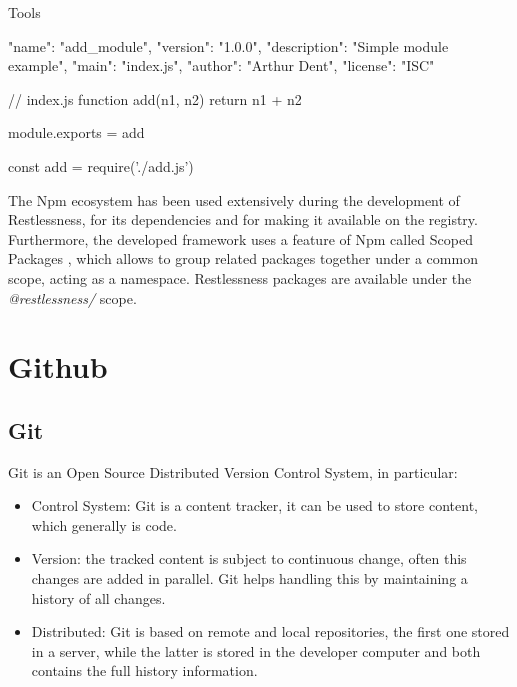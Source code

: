 \begin{chapter}{Tools}
    \bigskip
    \begin{code}[caption=A simple \textit{package.json},
        label={lst:add_module}, language=json]
{
    "name": "add_module",
    "version": "1.0.0",
    "description": "Simple module example",
    "main": "index.js",
    "author": "Arthur Dent",
    "license": "ISC"
}
    \end{code}

    \bigskip
    \begin{code}[caption=CommonJs module definition, label={lst:add_fn}]
// index.js
function add(n1, n2) {
  return n1 + n2
}

module.exports = add
    \end{code}

    \bigskip
    \begin{code}[caption=CommonJs module usage, label={lst:add_require}]
const add = require('./add.js')
    \end{code}

    The Npm ecosystem has been used extensively during the development of Restlessness,
    for its dependencies and for making it available on the registry.
    Furthermore, the developed framework uses a feature of Npm called Scoped Packages
    \cite{npm_scoped_packages}, which allows to group related packages together
    under a common scope, acting as a namespace. Restlessness packages are available
    under the \textit{@restlessness/} scope.

    \section{Github}
    \subsection{Git}
    Git is an Open Source Distributed Version Control System, in particular:
    \begin{itemize}
        \item Control System: Git is a content tracker, it can be used to store
            content, which generally is code.
        \item Version: the tracked content is subject to continuous change, often
            this changes are added in parallel. Git helps handling this by maintaining
            a history of all changes.
        \item Distributed: Git is based on remote and local repositories, the first
            one stored in a server, while the latter is stored in the developer
            computer and both contains the full history information.
    \end{itemize}


\end{chapter}
